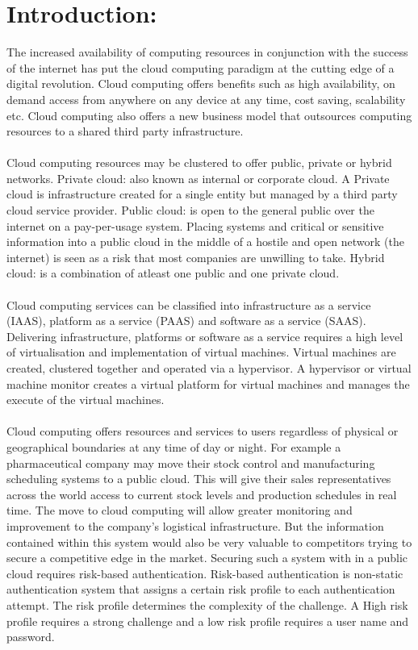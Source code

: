 \documentclass[11pt]{article}
\begin{document}
\section{Introduction:}
The increased availability of computing resources in conjunction with the success of the internet has put the cloud computing paradigm at the cutting edge of a digital revolution. Cloud computing offers benefits such as high availability, on demand access from anywhere on any device at any time, cost saving, scalability etc. \cite{Zhang2010} Cloud computing also offers a new business model that outsources computing resources to a shared third party infrastructure. 
\\ \\
Cloud computing resources may be clustered to offer public, private or hybrid networks. Private cloud: also known as internal or corporate cloud. A Private cloud is infrastructure created for a single entity but managed by a third party cloud service provider. Public cloud: is open to the general public over the internet on a pay-per-usage system. Placing systems and critical or sensitive information into a public cloud in the middle of a hostile and open network (the internet) is seen as a risk that most companies are unwilling to take. Hybrid cloud: is a combination of atleast one public and one private cloud.\cite{Onwubiko2010}
\\ \\
Cloud computing services can be classified into infrastructure as a service (IAAS), platform as a service (PAAS) and software as a service (SAAS). Delivering infrastructure, platforms or software as a service requires a high level of virtualisation and implementation of virtual machines. Virtual machines are created, clustered together and operated via a hypervisor. A hypervisor or virtual machine monitor creates a virtual platform for virtual machines and manages the execute of the virtual machines.
\\ \\
Cloud computing offers resources and services to users regardless of physical or geographical boundaries at any time of day or night. For example a pharmaceutical company may move their stock control and manufacturing scheduling systems to a public cloud. This will give their sales representatives across the world access to current stock levels and production schedules in real time. The move to cloud computing will allow greater monitoring and improvement to the company's logistical infrastructure. But the information contained within this system would also be very valuable to competitors trying to secure a competitive edge in the market. Securing such a system with in a public cloud requires risk-based authentication. Risk-based authentication is non-static authentication system that assigns a certain risk profile to each authentication attempt. The risk profile determines the complexity of the challenge. A High risk profile requires a strong challenge and a low risk profile requires a user name and password.
\end{document}

